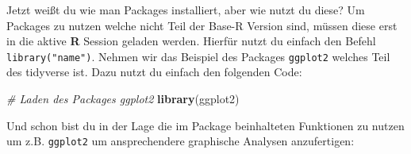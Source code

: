 \documentclass[
]{book}
\newenvironment{Shaded}{\begin{snugshade}}{\end{snugshade}}
\newcommand{\CommentTok}[1]{\textcolor[rgb]{0.56,0.35,0.01}{\textit{#1}}}
\newcommand{\KeywordTok}[1]{\textcolor[rgb]{0.13,0.29,0.53}{\textbf{#1}}}
\newcommand{\NormalTok}[1]{#1}
\begin{document}
Jetzt weißt du wie man Packages installiert, aber wie nutzt du diese? Um Packages zu nutzen welche nicht Teil der Base-R Version sind, müssen diese erst in die aktive \textbf{R} Session geladen werden. Hierfür nutzt du einfach den Befehl \texttt{library("name")}. Nehmen wir das Beispiel des Packages \texttt{ggplot2} welches Teil des tidyverse ist. Dazu nutzt du einfach den folgenden Code:

\begin{Shaded}
\begin{Highlighting}[]
\CommentTok{# Laden des Packages ggplot2}
  \KeywordTok{library}\NormalTok{(ggplot2)}
\end{Highlighting}
\end{Shaded}

Und schon bist du in der Lage die im Package beinhalteten Funktionen zu nutzen um z.B. \texttt{ggplot2} um ansprechendere graphische Analysen anzufertigen:
\end{document}
